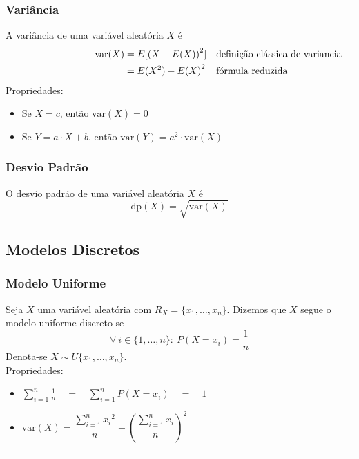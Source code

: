 \documentclass{article}
\begin{document}
\subsubsection{Variância}
A variância de uma variável aleatória $X$ é
\begin{align*}
  \hspace{80px} \text{var}(X) & = E[{(X - E(X))}^2] && \text{definição clássica de variancia} \\
  & = E(X^2) - {E(X)}^2 && \text{fórmula reduzida}
\end{align*}
Propriedades:
\begin{itemize}
  \item Se $X = c$, então $\text{var}(X) = 0$
  \item Se $Y = a \cdot X + b$, então $\text{var}(Y) = a^2 \cdot \text{var}(X)$
\end{itemize}

\subsubsection{Desvio Padrão}
O desvio padrão de uma variável aleatória $X$ é
\[ \text{dp}(X) = \sqrt{\text{var}(X)} \]


\subsection{Modelos Discretos}

\subsubsection{Modelo Uniforme}
Seja $X$ uma variável aleatória com $R_X = \{ x_1, \hdots, x_n \}$. Dizemos que $X$ segue o modelo uniforme discreto se
\[ \forall\: i \in \{ 1, \hdots, n \} :\> P(X = x_i) = \frac{1}{n} \]
Denota-se $X \sim U\{x_1, \hdots, x_n\}$. \\[10pt]
Propriedades:
\begin{itemize}
  \item $\sum\limits_{i=1}^{n} \frac{1}{n} \quad=\quad \sum\limits_{i=1}^{n} P(X = x_i) \quad=\quad 1$
  \item $\text{var}(X) = \dfrac{\sum\limits_{i=1}^{n} {x_i}^2}{n} - {\left( \dfrac{\sum\limits_{i=1}^{n} x_i}{n} \right)}^2$
\end{itemize}

\vspace{10pt}\hrule
\end{document}
